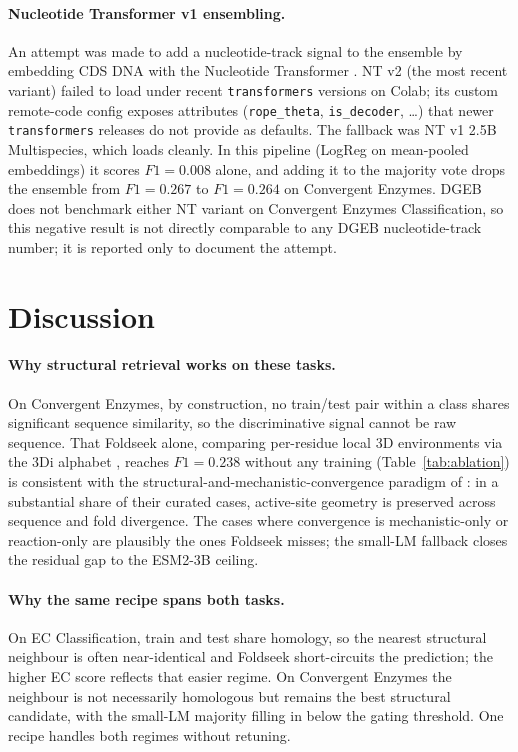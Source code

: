 \documentclass[11pt,letterpaper]{article}
\begin{document}
\paragraph{Nucleotide Transformer v1 ensembling.}
An attempt was made to add a nucleotide-track signal to the ensemble
by embedding CDS DNA with the Nucleotide Transformer
\citep{dallatorre2024nt}. NT v2 (the most recent variant) failed to
load under recent \texttt{transformers} versions on Colab; its custom
remote-code config exposes attributes (\texttt{rope\_theta},
\texttt{is\_decoder}, \dots) that newer \texttt{transformers}
releases do not provide as defaults. The fallback was NT v1 2.5B
Multispecies, which loads cleanly. In this pipeline (LogReg on
mean-pooled embeddings) it scores $F1 = 0.008$ alone, and adding it
to the majority vote drops the ensemble from $F1 = 0.267$ to
$F1 = 0.264$ on Convergent Enzymes. DGEB does not benchmark either NT
variant on Convergent Enzymes Classification, so this negative result
is not directly comparable to any DGEB nucleotide-track number; it is
reported only to document the attempt.

\section{Discussion}
\label{sec:discussion}

\paragraph{Why structural retrieval works on these tasks.}
On Convergent Enzymes, by construction, no train/test pair within a
class shares significant sequence similarity, so the discriminative
signal cannot be raw sequence. That Foldseek alone, comparing
per-residue local 3D environments via the 3Di alphabet
\citep{vankempen2024foldseek}, reaches $F1 = 0.238$ without any
training (Table~\ref{tab:ablation}) is consistent with the
structural-and-mechanistic-convergence paradigm of
\citet{riziotis2025paradigms}: in a substantial share of their curated
cases, active-site geometry is preserved across sequence and fold
divergence. The cases where convergence is mechanistic-only or
reaction-only are plausibly the ones Foldseek misses; the small-LM
fallback closes the residual gap to the ESM2-3B ceiling.

\paragraph{Why the same recipe spans both tasks.}
On EC Classification, train and test share homology, so the nearest
structural neighbour is often near-identical and Foldseek
short-circuits the prediction; the higher EC score reflects that
easier regime. On Convergent Enzymes the neighbour is not necessarily
homologous but remains the best structural candidate, with the small-LM
majority filling in below the gating threshold. One recipe handles both
regimes without retuning.
\end{document}

